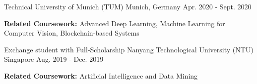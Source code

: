 \begin{cventries}
    {Technical University of Munich (TUM)} %
    {Munich, Germany} %
    {Apr. 2020 - Sept. 2020} %
    {\begin{cvitems} %
        \item {\textbf{Related Coursework:} Advanced Deep Learning, Machine Learning for Computer Vision, Blockchain-based Systems}
      \end{cvitems}
    }
\cvopenentry
    {Exchange student with Full-Scholarship}
    {Nanyang Technological University (NTU)} %
    {Singapore} %
    {Aug. 2019 - Dec. 2019} %
    {\begin{cvitems} %
        \item {\textbf{Related Coursework:} Artificial Intelligence and Data Mining}
      \end{cvitems}
    }
   
\end{cventries}

